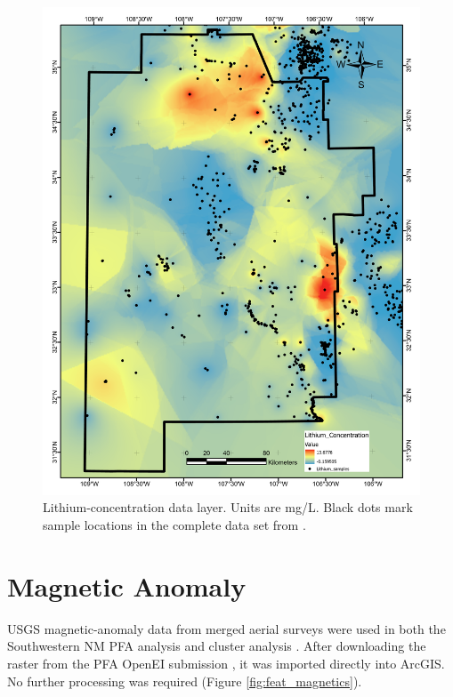 \begin{figure}[H]
\centering
\includegraphics[width=0.75\linewidth]{templates/images/Figure-Lithium.pdf}
\caption[Lithium concentration data layer]{Lithium-concentration data layer. Units are mg/L. Black dots mark sample locations in the complete data set from \protect\citet{bielicki_hydrogeolgic_2015}.}
\label{fig:feat_lithium}
\end{figure}

\section{Magnetic Anomaly}\label{app:dl_magnetic_anomaly}

USGS magnetic-anomaly data from merged aerial surveys \citep{bankey_digital_2002} were used in both the Southwestern NM PFA analysis \citep{bielicki_hydrogeolgic_2015} and cluster analysis \citep{pepin_new_2019}. After downloading the raster from the PFA OpenEI submission \citep{kelley_geothermal_2015}, it was imported directly into ArcGIS. No further processing was required (Figure \ref{fig:feat_magnetics}).

